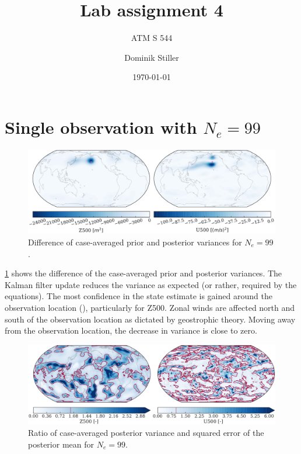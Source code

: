 \documentclass[parskip=half,DIV=16]{scrartcl}
\title{Lab assignment 4}
\subtitle{ATM S 544}
\author{Dominik Stiller}
\date{\today}
\begin{document}
\maketitle



\section{Single observation with $N_e = 99$}

\begin{figure}[H]
   \centering
   \includegraphics[width=\textwidth]{figures/exp1_prior_post_var.pdf}
   \caption{Difference of case-averaged prior and posterior variances for $N_e = 99$.}
   \label{fig:exp1-1}
\end{figure}

\cref{fig:exp1-1} shows the difference of the case-averaged prior and posterior variances. The Kalman filter update reduces the variance as expected (or rather, required by the equations). The most confidence in the state estimate is gained around the observation location (\textcolor{mpl-pink}{}), particularly for Z500. Zonal winds are affected north and south of the observation location as dictated by geostrophic theory. Moving away from the observation location, the decrease in variance is close to zero.


\begin{figure}[H]
   \centering
   \includegraphics[width=\textwidth]{figures/exp1_var_se_ratio.pdf}
   \caption{Ratio of case-averaged posterior variance and squared error of the posterior mean for $N_e = 99$.}
   \label{fig:exp1-2}
\end{figure}
\end{document}
